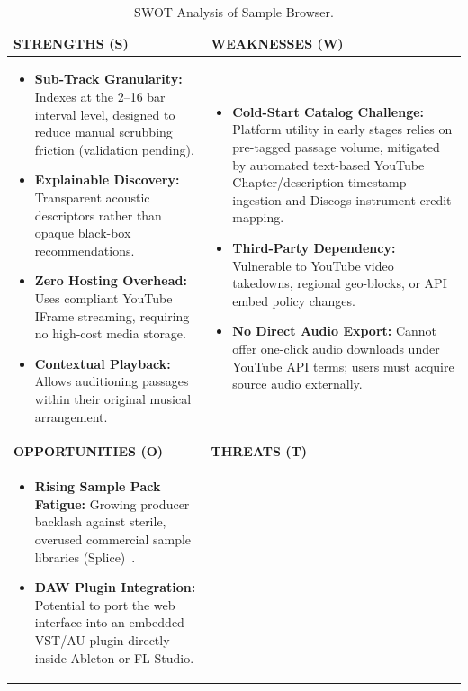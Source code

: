 \begin{table}[h]
    \centering
    \caption{SWOT Analysis of Sample Browser.}
    \begin{tabularx}{\textwidth}{|>{\raggedright\arraybackslash}X|>{\raggedright\arraybackslash}X|}
        \hline
        \textbf{STRENGTHS (S)} & \textbf{WEAKNESSES (W)} \\
        \hline
        \begin{itemize}[leftmargin=*]
            \item \textbf{Sub-Track Granularity:} Indexes at the 2--16 bar interval level, designed to reduce manual scrubbing friction (validation pending).
            \item \textbf{Explainable Discovery:} Transparent acoustic descriptors rather than opaque black-box recommendations.
            \item \textbf{Zero Hosting Overhead:} Uses compliant YouTube IFrame streaming, requiring no high-cost media storage.
            \item \textbf{Contextual Playback:} Allows auditioning passages within their original musical arrangement.
        \end{itemize} & 
        \begin{itemize}[leftmargin=*]
            \item \textbf{Cold-Start Catalog Challenge:} Platform utility in early stages relies on pre-tagged passage volume, mitigated by automated text-based YouTube Chapter/description timestamp ingestion and Discogs instrument credit mapping.
            \item \textbf{Third-Party Dependency:} Vulnerable to YouTube video takedowns, regional geo-blocks, or API embed policy changes.
            \item \textbf{No Direct Audio Export:} Cannot offer one-click audio downloads under YouTube API terms; users must acquire source audio externally.
        \end{itemize} \\
        \hline
        \textbf{OPPORTUNITIES (O)} & \textbf{THREATS (T)} \\
        \hline
        \begin{itemize}[leftmargin=*]
            \item \textbf{Rising Sample Pack Fatigue:} Growing producer backlash against sterile, overused commercial sample libraries (Splice)~\cite{ref:mbw_splice}.
            \item \textbf{DAW Plugin Integration:} Potential to port the web interface into an embedded VST/AU plugin directly inside Ableton or FL Studio.

\end{itemize}
\end{tabularx}
\end{table}
